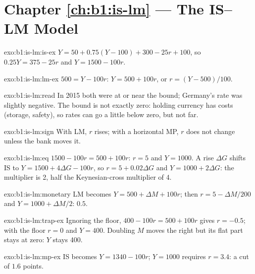 \section*{Chapter \ref{ch:b1:is-lm} --- The IS--LM Model}

\begin{solution}{exo:b1:is-lm:is-ex}
$Y = 50 + 0.75(Y - 100) + 300 - 25r + 100$, so $0.25Y = 375 - 25r$ and $Y = 1500 - 100r$.
\end{solution}

\begin{solution}{exo:b1:is-lm:lm-ex}
$500 = Y - 100r$: $Y = 500 + 100r$, or $r = (Y - 500)/100$.
\end{solution}

\begin{solution}{exo:b1:is-lm:read}
In 2015 both were at or near the bound; Germany's rate was slightly
negative. The bound is not exactly zero: holding currency has costs
(storage, safety), so rates can go a little below zero, but not far.
\end{solution}

\begin{solution}{exo:b1:is-lm:sign}
With LM, $r$ rises; with a horizontal MP, $r$ does not change unless the bank
moves it.
\end{solution}

\begin{solution}{exo:b1:is-lm:eq}
$1500 - 100r = 500 + 100r$: $r = 5$ and $Y = 1000$. A rise $\Delta G$ shifts IS to
$Y = 1500 + 4\Delta G - 100r$, so $r = 5 + 0.02\Delta G$ and $Y = 1000 + 2\Delta G$: the multiplier is 2,
half the Keynesian-cross multiplier of 4.
\end{solution}

\begin{solution}{exo:b1:is-lm:monetary}
LM becomes $Y = 500 + \Delta M + 100r$; then $r = 5 - \Delta M/200$ and $Y = 1000 + \Delta M/2$: $0.5$.
\end{solution}

\begin{solution}{exo:b1:is-lm:trap-ex}
Ignoring the floor, $400 - 100r = 500 + 100r$ gives $r = -0.5$; with the floor $r = 0$ and
$Y = 400$. Doubling $M$ moves the  right but its flat part stays at
zero: $Y$ stays 400.
\end{solution}

\begin{solution}{exo:b1:is-lm:mp-ex}
IS becomes $Y = 1340 - 100r$; $Y = 1000$ requires $r = 3.4$: a cut of $1.6$ points.
\end{solution}


